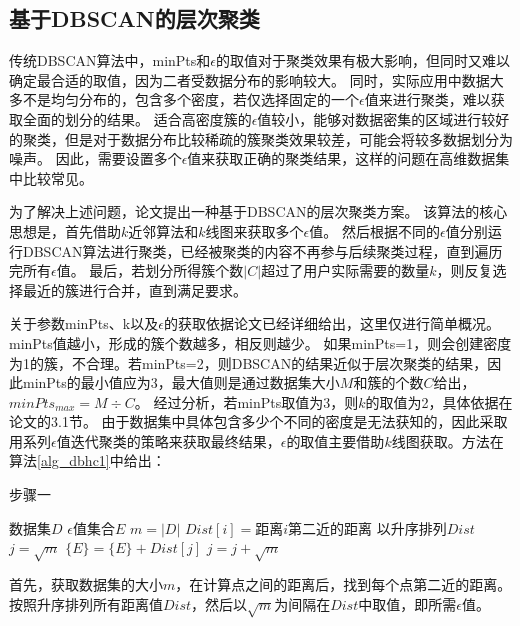 \subsection{基于DBSCAN的层次聚类}
传统DBSCAN算法中，minPts和$ \epsilon $的取值对于聚类效果有极大影响，但同时又难以确定最合适的取值，因为二者受数据分布的影响较大。
同时，实际应用中数据大多不是均匀分布的，包含多个密度，若仅选择固定的一个$ \epsilon $值来进行聚类，难以获取全面的划分的结果。
适合高密度簇的$ \epsilon $值较小，能够对数据密集的区域进行较好的聚类，但是对于数据分布比较稀疏的簇聚类效果较差，可能会将较多数据划分为噪声。
因此，需要设置多个$ \epsilon $值来获取正确的聚类结果，这样的问题在高维数据集中比较常见。

为了解决上述问题，论文\cite{latifi2021dbhc}提出一种基于DBSCAN的层次聚类方案。
该算法的核心思想是，首先借助$ k $近邻算法和$ k $线图来获取多个$ \epsilon $值。
然后根据不同的$ \epsilon $值分别运行DBSCAN算法进行聚类，已经被聚类的内容不再参与后续聚类过程，直到遍历完所有$ \epsilon $值。
最后，若划分所得簇个数$ |C| $超过了用户实际需要的数量$ k $，则反复选择最近的簇进行合并，直到满足要求。

关于参数minPts、k以及$\epsilon$的获取依据论文已经详细给出，这里仅进行简单概况。minPts值越小，形成的簇个数越多，相反则越少。
如果minPts=1，则会创建密度为1的簇，不合理。若minPts=2，则DBSCAN的结果近似于层次聚类的结果，因此minPts的最小值应为3，最大值则是通过数据集大小$ M $和簇的个数$ C $给出，$ minPts_{max} = M\div C $。
经过分析，若minPts取值为3，则$ k $的取值为2，具体依据在论文\cite{latifi2021dbhc}的3.1节。
由于数据集中具体包含多少个不同的密度是无法获知的，因此采取用系列$\epsilon$值迭代聚类的策略来获取最终结果，$\epsilon$的取值主要借助$ k $线图获取。方法在算法\ref{alg_dbhc1}中给出：

\begin{algorithm}[htbp]
	\renewcommand{\algorithmicrequire}{\textbf{输入:}}
	\renewcommand{\algorithmicensure}{\textbf{输出:}}
	\caption{步骤一}
	\label{alg_dbhc1}
	\begin{algorithmic}[1]
		\REQUIRE 数据集$ D $
		\ENSURE $\epsilon$值集合$ E $
		\STATE $ m = |D| $
		\STATE $ Dist[i] =$距离$i$第二近的距离
		\ENDFOR
		\STATE 以升序排列$ Dist $
		\STATE $ j = \sqrt{m} $
		\STATE $ \{E\} = \{E\} + Dist[j] $
		\STATE $ j = j + \sqrt{m} $
		\ENDWHILE
	\end{algorithmic}
\end{algorithm}

首先，获取数据集的大小$ m $，在计算点之间的距离后，找到每个点第二近的距离。按照升序排列所有距离值$ Dist $，然后以$ \sqrt{m} $为间隔在$ Dist $中取值，即所需$\epsilon$值。

